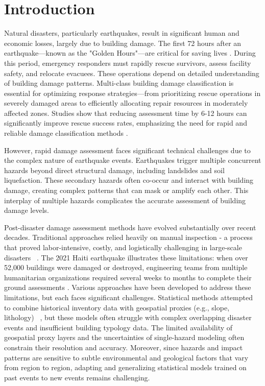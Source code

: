\documentclass[review]{elsarticle}
\begin{document}
\section{Introduction}
Natural disasters, particularly earthquakes, result in significant human and economic losses, largely due to building damage. The first 72 hours after an earthquake—known as the "Golden Hours"—are critical for saving lives \cite{li2023disasternet}. During this period, emergency responders must rapidly rescue survivors, assess facility safety, and relocate evacuees. These operations depend on detailed understanding of building damage patterns. Multi-class building damage classification is essential for optimizing response strategies—from prioritizing rescue operations in severely damaged areas to efficiently allocating repair resources in moderately affected zones. Studies show that reducing assessment time by 6-12 hours can significantly improve rescue success rates, emphasizing the need for rapid and reliable damage classification methods \cite{erdik2011rapid}.

However, rapid damage assessment faces significant technical challenges due to the complex nature of earthquake events. Earthquakes trigger multiple concurrent hazards beyond direct structural damage, including landslides and soil liquefaction. These secondary hazards often co-occur and interact with building damage, creating complex patterns that can mask or amplify each other. This interplay of multiple hazards complicates the accurate assessment of building damage levels.

Post-disaster damage assessment methods have evolved substantially over recent decades. Traditional approaches relied heavily on manual inspection - a process that proved labor-intensive, costly, and logistically challenging in large-scale disasters ~\cite{gueguen2015large}. The 2021 Haiti earthquake illustrates these limitations: when over 52,000 buildings were damaged or destroyed, engineering teams from multiple humanitarian organizations required several weeks to months to complete their ground assessments \cite{undp2021haiti}. Various approaches have been developed to address these limitations, but each faces significant challenges. Statistical methods attempted to combine historical inventory data with geospatial proxies (e.g., slope, lithology) ~\cite{marc2016seismologically, nowicki2018global, zhu2017updated}, but these models often struggle with complex overlapping disaster events and insufficient building typology data. The limited availability of geospatial proxy layers and the uncertainties of single-hazard modeling often constrain their resolution and accuracy. Moreover, since hazards and impact patterns are sensitive to subtle environmental and geological factors that vary from region to region, adapting and generalizing statistical models trained on past events to new events remains challenging.
\end{document}
